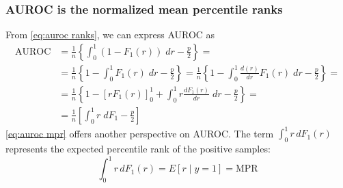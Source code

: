 

\subsubsection{AUROC is the normalized mean percentile ranks}
\label{sec:auroc mpr}

From \autoref{eq:auroc ranks}, we can express AUROC as
%
\begin{align}
    \text{AUROC}
        &= \frac{1}{n} \left\{
            \int_{0}^{1} (1 - F_1(r)) \;dr - \frac{p}{2}
        \right\}
    =\nonumber\\ &
        = \frac{1}{n} \left\{
            1 - \int_{0}^{1} F_1(r) \;dr - \frac{p}{2}
        \right\}
        = \frac{1}{n} \left\{
            1 - \int_{0}^{1} \frac{d(r)}{dr}F_1(r) \;dr - \frac{p}{2}
        \right\}
    =\nonumber\\ &
        = \frac{1}{n} \left\{
            1 - \left[rF_1(r)\right]_0^1 + \int_{0}^{1} r \frac{d F_1(r)}{dr} \;dr - \frac{p}{2}
        \right\}
    =\nonumber\\ &
        = \frac{1}{n} \left[
            \int_{0}^{1} r \;d F_1 - \frac{p}{2}
        \right]
    \label{eq:auroc mpr}
\end{align}
%
\autoref{eq:auroc mpr} offers another perspective on AUROC. The term $\int_{0}^{1} r\,d F_1(r)$ represents the expected percentile rank of the positive samples:
%
\begin{equation}
    \int_{0}^{1} r\,d F_1(r) = E[r \mid y = 1] = \text{MPR}
    \label{eq:mpr}    
\end{equation}
%
%
